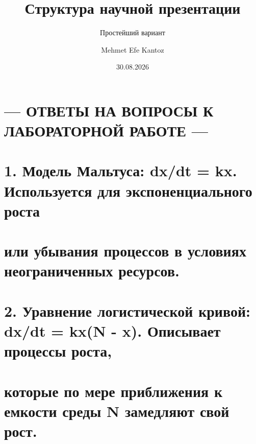 \documentclass[
  english,
  russian,
  12pt,
  a4paper,
  DIV=11,
  numbers=noendperiod]{scrreprt}
\title{Структура научной презентации}
\subtitle{Простейший вариант}
\author{Mehmet Efe Kantoz}
\date{30.08.2026}
\renewcommand*\contentsname{Содержание}
\newcommand\contentsname{Содержание}
\begin{document}
\maketitle

\renewcommand*\contentsname{Содержание}
{
\setcounter{tocdepth}{1}
\tableofcontents
}
\listoffigures
\listoftables

\chapter{--- ОТВЕТЫ НА ВОПРОСЫ К ЛАБОРАТОРНОЙ РАБОТЕ
---}\label{ux43eux442ux432ux435ux442ux44b-ux43dux430-ux432ux43eux43fux440ux43eux441ux44b-ux43a-ux43bux430ux431ux43eux440ux430ux442ux43eux440ux43dux43eux439-ux440ux430ux431ux43eux442ux435}

\chapter{1. Модель Мальтуса: dx/dt = kx. Используется для
экспоненциального
роста}\label{ux43cux43eux434ux435ux43bux44c-ux43cux430ux43bux44cux442ux443ux441ux430-dxdt-kx.-ux438ux441ux43fux43eux43bux44cux437ux443ux435ux442ux441ux44f-ux434ux43bux44f-ux44dux43aux441ux43fux43eux43dux435ux43dux446ux438ux430ux43bux44cux43dux43eux433ux43e-ux440ux43eux441ux442ux430}

\chapter{или убывания процессов в условиях неограниченных
ресурсов.}\label{ux438ux43bux438-ux443ux431ux44bux432ux430ux43dux438ux44f-ux43fux440ux43eux446ux435ux441ux441ux43eux432-ux432-ux443ux441ux43bux43eux432ux438ux44fux445-ux43dux435ux43eux433ux440ux430ux43dux438ux447ux435ux43dux43dux44bux445-ux440ux435ux441ux443ux440ux441ux43eux432.}

\chapter{2. Уравнение логистической кривой: dx/dt = kx(N - x). Описывает
процессы
роста,}\label{ux443ux440ux430ux432ux43dux435ux43dux438ux435-ux43bux43eux433ux438ux441ux442ux438ux447ux435ux441ux43aux43eux439-ux43aux440ux438ux432ux43eux439-dxdt-kxn---x.-ux43eux43fux438ux441ux44bux432ux430ux435ux442-ux43fux440ux43eux446ux435ux441ux441ux44b-ux440ux43eux441ux442ux430}

\chapter{которые по мере приближения к емкости среды N замедляют свой
рост.}\label{ux43aux43eux442ux43eux440ux44bux435-ux43fux43e-ux43cux435ux440ux435-ux43fux440ux438ux431ux43bux438ux436ux435ux43dux438ux44f-ux43a-ux435ux43cux43aux43eux441ux442ux438-ux441ux440ux435ux434ux44b-n-ux437ux430ux43cux435ux434ux43bux44fux44eux442-ux441ux432ux43eux439-ux440ux43eux441ux442.}
\end{document}

